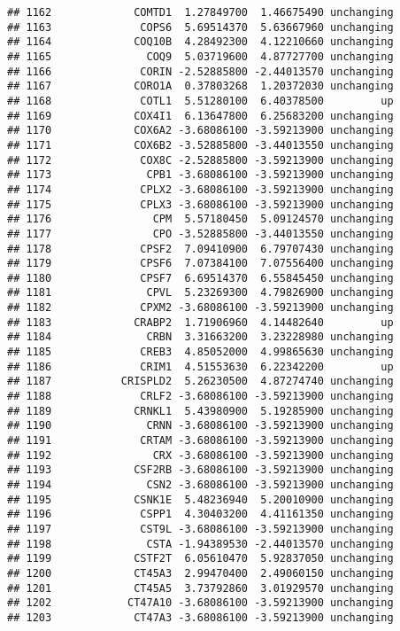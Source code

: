 \documentclass[]{article}
\begin{document}
\begin{verbatim}
## 1162             COMTD1  1.27849700  1.46675490 unchanging
## 1163              COPS6  5.69514370  5.63667960 unchanging
## 1164             COQ10B  4.28492300  4.12210660 unchanging
## 1165               COQ9  5.03719600  4.87727700 unchanging
## 1166              CORIN -2.52885800 -2.44013570 unchanging
## 1167             CORO1A  0.37803268  1.20372030 unchanging
## 1168              COTL1  5.51280100  6.40378500         up
## 1169             COX4I1  6.13647800  6.25683200 unchanging
## 1170             COX6A2 -3.68086100 -3.59213900 unchanging
## 1171             COX6B2 -3.52885800 -3.44013550 unchanging
## 1172              COX8C -2.52885800 -3.59213900 unchanging
## 1173               CPB1 -3.68086100 -3.59213900 unchanging
## 1174              CPLX2 -3.68086100 -3.59213900 unchanging
## 1175              CPLX3 -3.68086100 -3.59213900 unchanging
## 1176                CPM  5.57180450  5.09124570 unchanging
## 1177                CPO -3.52885800 -3.44013550 unchanging
## 1178              CPSF2  7.09410900  6.79707430 unchanging
## 1179              CPSF6  7.07384100  7.07556400 unchanging
## 1180              CPSF7  6.69514370  6.55845450 unchanging
## 1181               CPVL  5.23269300  4.79826900 unchanging
## 1182              CPXM2 -3.68086100 -3.59213900 unchanging
## 1183             CRABP2  1.71906960  4.14482640         up
## 1184               CRBN  3.31663200  3.23228980 unchanging
## 1185              CREB3  4.85052000  4.99865630 unchanging
## 1186              CRIM1  4.51553630  6.22342200         up
## 1187           CRISPLD2  5.26230500  4.87274740 unchanging
## 1188              CRLF2 -3.68086100 -3.59213900 unchanging
## 1189             CRNKL1  5.43980900  5.19285900 unchanging
## 1190               CRNN -3.68086100 -3.59213900 unchanging
## 1191              CRTAM -3.68086100 -3.59213900 unchanging
## 1192                CRX -3.68086100 -3.59213900 unchanging
## 1193             CSF2RB -3.68086100 -3.59213900 unchanging
## 1194               CSN2 -3.68086100 -3.59213900 unchanging
## 1195             CSNK1E  5.48236940  5.20010900 unchanging
## 1196              CSPP1  4.30403200  4.41161350 unchanging
## 1197              CST9L -3.68086100 -3.59213900 unchanging
## 1198               CSTA -1.94389530 -2.44013570 unchanging
## 1199             CSTF2T  6.05610470  5.92837050 unchanging
## 1200             CT45A3  2.99470400  2.49060150 unchanging
## 1201             CT45A5  3.73792860  3.01929570 unchanging
## 1202            CT47A10 -3.68086100 -3.59213900 unchanging
## 1203             CT47A3 -3.68086100 -3.59213900 unchanging

\end{verbatim}
\end{document}
